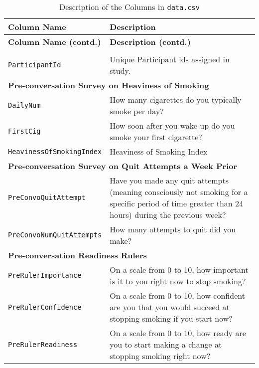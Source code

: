 \begin{longtable}{l p{10cm}}
\caption{Description of the Columns in \texttt{data.csv}}\\

\toprule
\textbf{Column Name} & \textbf{Description}\\
\midrule
\endfirsthead

\toprule
\textbf{Column Name (contd.)} & \textbf{Description (contd.)}\\
\midrule
\endhead


\endfoot

\bottomrule
\endlastfoot

\multicolumn{2}{l}{\textbf{Basic}} \\
\texttt{ParticipantId} & Unique Participant ids assigned in study.\\
\midrule


\multicolumn{2}{l}{\textbf{Pre-conversation Survey on Heaviness of Smoking}} \\
\texttt{DailyNum} & How many cigarettes do you typically smoke per day?\\ 
\texttt{FirstCig} & How soon after you wake up do you smoke your first cigarette?\\
\texttt{HeavinessOfSmokingIndex} & Heaviness of Smoking Index \citep{heatherton1989measuring}\\
\midrule

\multicolumn{2}{l}{\textbf{Pre-conversation Survey on Quit Attempts a Week Prior}} \\
\texttt{PreConvoQuitAttempt} & Have you made any quit attempts (meaning consciously not smoking for a specific period of time greater than 24 hours) during the previous week?\\
\texttt{PreConvoNumQuitAttempts} & How many attempts to quit did you make?\\
\midrule


\multicolumn{2}{l}{\textbf{Pre-conversation Readiness Rulers}} \\
\texttt{PreRulerImportance} & On a scale from 0 to 10, how important is it to you right now to stop smoking?\\
\texttt{PreRulerConfidence} & On a scale from 0 to 10, how confident are you that you would succeed at stopping smoking if you start now?\\
\texttt{PreRulerReadiness} & On a scale from 0 to 10, how ready are you to start making a change at stopping smoking right now?\\
\midrule


\end{longtable}
